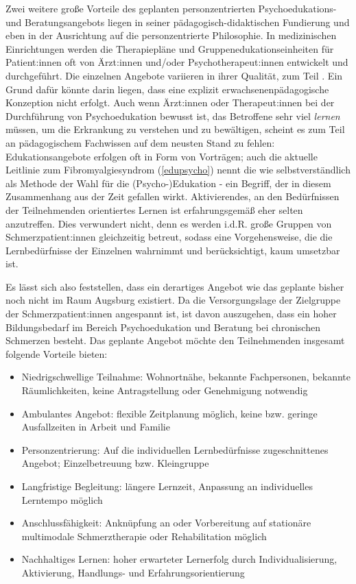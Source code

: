 \documentclass[
  twoside,
  parskip=half-,
]{scrreprt}
\begin{document}
Zwei weitere große Vorteile des geplanten personzentrierten Psychoedukations- und Beratungsangebots liegen in seiner pädagogisch-didaktischen Fundierung und eben in der Ausrichtung auf die personzentrierte Philosophie. In medizinischen Einrichtungen werden die Therapiepläne und Gruppenedukationseinheiten für Patient:innen oft von Ärzt:innen und/oder Psychotherapeut:innen entwickelt und durchgeführt. Die einzelnen Angebote variieren in ihrer Qualität, zum Teil . Ein Grund dafür könnte darin liegen, dass eine explizit erwachsenenpädagogische Konzeption nicht erfolgt. Auch wenn Ärzt:innen oder Therapeut:innen bei der Durchführung von Psychoedukation bewusst ist, das Betroffene sehr viel \textit{lernen} müssen, um die Erkrankung zu verstehen und zu bewältigen, scheint es zum Teil an pädagogischem Fachwissen auf dem neusten Stand zu fehlen: Edukationsangebote erfolgen oft in Form von Vorträgen; auch die aktuelle Leitlinie zum Fibromyalgiesyndrom (\autoref{edupsycho}) nennt die  wie selbstverständlich als Methode der Wahl für die (Psycho-)Edukation - ein Begriff, der in diesem Zusammenhang aus der Zeit gefallen wirkt. Aktivierendes, an den Bedürfnissen der Teilnehmenden orientiertes Lernen ist erfahrungsgemäß eher selten anzutreffen. Dies verwundert nicht, denn es werden i.d.R. große Gruppen von Schmerzpatient:innen gleichzeitig betreut, sodass eine Vorgehensweise, die die Lernbedürfnisse der Einzelnen wahrnimmt und berücksichtigt, kaum umsetzbar ist.

Es lässt sich also feststellen, dass ein derartiges Angebot wie das geplante bisher noch nicht im Raum Augsburg existiert. Da die Versorgungslage der Zielgruppe der Schmerzpatient:innen angespannt ist, ist davon auszugehen, dass ein hoher Bildungsbedarf im Bereich Psychoedukation und Beratung bei chronischen Schmerzen besteht. Das geplante Angebot möchte den Teilnehmenden insgesamt folgende Vorteile bieten:
\begin{itemize}
  \item Niedrigschwellige Teilnahme: Wohnortnähe, bekannte Fachpersonen, bekannte Räumlichkeiten, keine Antragstellung oder Genehmigung notwendig
  \item Ambulantes Angebot: flexible Zeitplanung möglich, keine bzw. geringe Ausfallzeiten in Arbeit und Familie
  \item Personzentrierung: Auf die individuellen Lernbedürfnisse zugeschnittenes Angebot; Einzelbetreuung bzw. Kleingruppe
  \item Langfristige Begleitung: längere Lernzeit, Anpassung an individuelles Lerntempo möglich
  \item Anschlussfähigkeit: Anknüpfung an oder Vorbereitung auf stationäre multimodale Schmerztherapie oder Rehabilitation möglich
  \item Nachhaltiges Lernen: hoher erwarteter Lernerfolg durch Individualisierung, Aktivierung, Handlungs- und Erfahrungsorientierung
\end{itemize}
\end{document}

